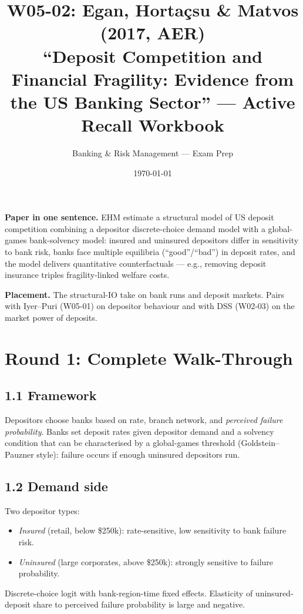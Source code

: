 \documentclass[11pt]{article}
\title{W05-02: Egan, Hortaçsu \& Matvos (2017, AER) \\
\large ``Deposit Competition and Financial Fragility: Evidence from the US Banking Sector'' --- Active Recall Workbook}
\author{Banking \& Risk Management --- Exam Prep}
\date{\today}
\begin{document}
\maketitle

\begin{keybox}
\textbf{Paper in one sentence.} EHM estimate a structural model of US deposit competition combining a depositor discrete-choice demand model with a global-games bank-solvency model: insured and uninsured depositors differ in sensitivity to bank risk, banks face multiple equilibria (``good''/``bad'') in deposit rates, and the model delivers quantitative counterfactuals --- e.g., removing deposit insurance triples fragility-linked welfare costs.

\textbf{Placement.} The structural-IO take on bank runs and deposit markets. Pairs with Iyer--Puri (W05-01) on depositor behaviour and with DSS (W02-03) on the market power of deposits.
\end{keybox}

\section*{Round 1: Complete Walk-Through}

\subsection*{1.1 Framework}
Depositors choose banks based on rate, branch network, and \emph{perceived failure probability}. Banks set deposit rates given depositor demand and a solvency condition that can be characterised by a global-games threshold (Goldstein--Pauzner style): failure occurs if enough uninsured depositors run.

\subsection*{1.2 Demand side}
Two depositor types:
\begin{itemize}
\item \emph{Insured} (retail, below \$250k): rate-sensitive, low sensitivity to bank failure risk.
\item \emph{Uninsured} (large corporates, above \$250k): strongly sensitive to failure probability.
\end{itemize}
Discrete-choice logit with bank-region-time fixed effects. Elasticity of uninsured-deposit share to perceived failure probability is large and negative.
\end{document}
